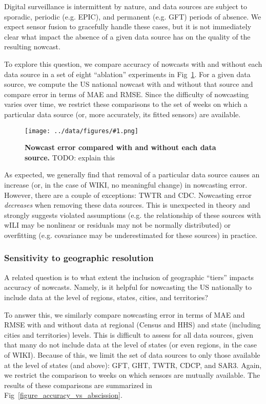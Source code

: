 \documentclass[10pt,letterpaper]{article}
\newcommand{\maybeincludegraphics}[1]{\texttt{[image: ../data/figures/\#1.png]}}
\begin{document}
Digital surveillance is intermittent by nature, and data sources are subject to
sporadic, periodic (e.g. EPIC), and permanent (e.g. GFT) periods of
absence. We expect sensor fusion to gracefully handle these cases, but it is
not immediately clear what impact the absence of a given data source has on the
quality of the resulting nowcast.

To explore this question, we compare accuracy of nowcasts with and without each
data source in a set of eight ``ablation'' experiments in
Fig~\ref{figure_accuracy_vs_ablation}. For a given data source, we compute the
US national nowcast with and without that source and compare error in terms of
MAE and RMSE. Since the difficulty of nowcasting varies over time, we restrict
these comparisons to the set of weeks on which a particular data source (or,
more accurately, its fitted sensors) are available.

\begin{figure}[!ht]
  \maybeincludegraphics{accuracy_vs_ablation}
  \caption{
    {\bf Nowcast error compared with and without each data source.}
    TODO: explain this
  }
  \label{figure_accuracy_vs_ablation}
\end{figure}

As expected, we generally find that removal of a particular data source causes
an increase (or, in the case of WIKI, no meaningful change) in nowcasting
error. However, there are a couple of exceptions: TWTR and CDC. Nowcasting
error \textit{decreases} when removing these data sources. This is unexpected
in theory and strongly suggests violated assumptions (e.g. the relationship of
these sources with wILI may be nonlinear or residuals may not be normally
distributed) or overfitting (e.g. covariance may be underestimated for these
sources) in practice.

\subsubsection*{Sensitivity to geographic resolution}

A related question is to what extent the inclusion of geographic ``tiers''
impacts accuracy of nowcasts. Namely, is it helpful for nowcasting the US
nationally to include data at the level of regions, states, cities, and
territories?

To answer this, we similarly compare nowcasting error in terms of MAE and RMSE
with and without data at regional (Census and HHS) and state (including cities
and territories) levels. This is difficult to assess for all data sources,
given that many do not include data at the level of states (or even regions, in
the case of WIKI). Because of this, we limit the set of data sources to only
those available at the level of states (and above): GFT, GHT, TWTR, CDCP, and
SAR3. Again, we restrict the comparison to weeks on which sensors are mutually
available. The results of these comparisons are summarized in
Fig~\ref{figure_accuracy_vs_abscission}.
\end{document}
